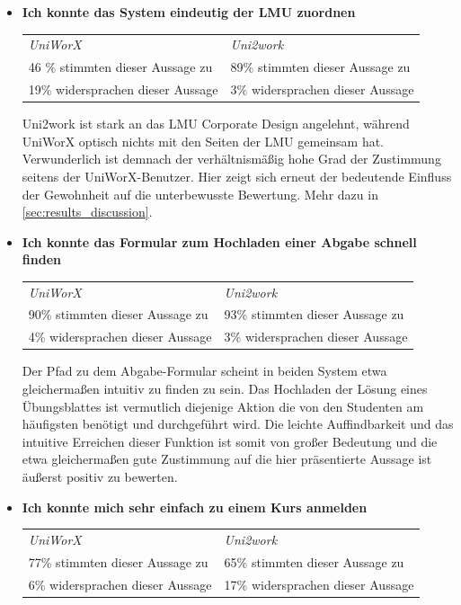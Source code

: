 \documentclass[11pt,a4paper,twoside,ngerman]{article}
\begin{document}
\begin{itemize}
    \item \textbf{Ich konnte das System eindeutig der LMU zuordnen}
    
    \smallskip
    \begin{tabular}{p{6.5cm}|p{6.5cm}}
        \textit{UniWorX} & \textit{Uni2work} \\
        46 \% stimmten dieser Aussage zu & 89\% stimmten dieser Aussage zu \\
        19\% widersprachen dieser Aussage & 3\% widersprachen dieser Aussage
    \end{tabular}
    
    \smallskip
    Uni2work ist stark an das LMU Corporate Design angelehnt, während UniWorX optisch nichts mit den Seiten der LMU gemeinsam hat. Verwunderlich ist demnach der verhältnismäßig hohe Grad der Zustimmung seitens der UniWorX-Benutzer. Hier zeigt sich erneut der bedeutende Einfluss der Gewohnheit auf die unterbewusste Bewertung. Mehr dazu in \autoref{sec:results_discussion}.
    \item \textbf{Ich konnte das Formular zum Hochladen einer Abgabe schnell finden}
    
    \smallskip
    \begin{tabular}{p{6.5cm}|p{6.5cm}}
        \textit{UniWorX} & \textit{Uni2work} \\
        90\% stimmten dieser Aussage zu & 93\% stimmten dieser Aussage zu \\
        4\% widersprachen dieser Aussage & 3\% widersprachen dieser Aussage
    \end{tabular}
    
    \smallskip
    Der Pfad zu dem Abgabe-Formular scheint in beiden System etwa gleichermaßen intuitiv zu finden zu sein. Das Hochladen der Lösung eines Übungsblattes ist vermutlich diejenige Aktion die von den Studenten am häufigsten benötigt und durchgeführt wird. Die leichte Auffindbarkeit und das intuitive Erreichen dieser Funktion ist somit von großer Bedeutung und die etwa gleichermaßen gute Zustimmung auf die hier präsentierte Aussage ist äußerst positiv zu bewerten.
    \item \textbf{Ich konnte mich sehr einfach zu einem Kurs anmelden}
    
    \smallskip
    \begin{tabular}{p{6.5cm}|p{6.5cm}}
        \textit{UniWorX} & \textit{Uni2work} \\
        77\% stimmten dieser Aussage zu & 65\% stimmten dieser Aussage zu \\
        6\% widersprachen dieser Aussage & 17\% widersprachen dieser Aussage
    \end{tabular}
    

\end{itemize}
\end{document}
